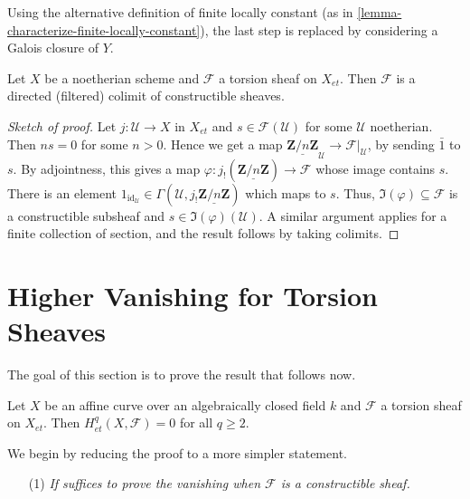 \begin{remark}
\label{remark-alternative}
Using the alternative definition of finite locally constant (as in
\ref{lemma-characterize-finite-locally-constant}), the last step is replaced
by considering a Galois closure of $Y$.
\end{remark}

\begin{lemma}
\label{lemma-torsion-colimit-constructible}
Let $X$ be a noetherian scheme and $\mathcal{F}$ a torsion sheaf on $X_{et}$.
Then $\mathcal{F}$ is a directed (filtered) colimit of constructible sheaves.
\end{lemma}

\begin{proof}[Sketch of proof]
Let $j: \mathcal{U} \to X$ in $X_{et}$ and $s\in \mathcal{F}(\mathcal{U})$ for
some $\mathcal{U}$ noetherian. Then $ns = 0$ for some $n>0$. Hence we get a map
$\underline{\mathbf{Z}/n\mathbf{Z}}_\mathcal{U}\to \mathcal{F}|_\mathcal{U}$,
by sending $\bar 1$ to $s$. By adjointness, this gives a map $\varphi:
j_!(\underline{\mathbf{Z}/n\mathbf{Z}}) \to \mathcal{F}$ whose image contains
$s$. There is an element $1_{\text{id}_\mathcal{U}} \in \Gamma(\mathcal{U},
j_!\underline{\mathbf{Z}/n\mathbf{Z}})$ which maps to $s$. Thus, $\Im(\varphi)
\subseteq \mathcal{F}$ is a constructible subsheaf and $s\in
\Im(\varphi)(\mathcal{U})$. A similar argument applies for a finite collection
of section, and the result follows by taking colimits.
\end{proof}




\section{Higher Vanishing for Torsion Sheaves}
\label{section-vanishing-torsion}

\noindent
The goal of this section is to prove the result that follows now.

\begin{theorem}
\label{theorem-vanishing-affine-curves}
Let $X$ be an affine curve over an algebraically closed field $k$ and
$\mathcal{F}$ a torsion sheaf on $X_{et}$. Then $H_{et}^q(X, \mathcal{F}) = 0$
for all $q\geq 2$.
\end{theorem}

\noindent
We begin by reducing the proof to a more simpler statement.
\begin{enumerate}
\item[(1)] {\it If suffices to prove the vanishing when $\mathcal{F}$
is a constructible sheaf.}
\end{enumerate}

